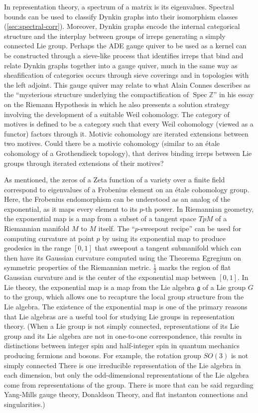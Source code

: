 \documentclass{article}
\theoremstyle{definition}
\begin{document}
In representation theory, a spectrum of a matrix is its eigenvalues.
Spectral bounds can be used to classify Dynkin graphs into their isomorphism classes (\cref{sec:spectral-corr}).
Moreover, Dynkin graphs encode the internal categorical structure and the interplay between groups of irreps generating a simply connected Lie group.
Perhaps the ADE gauge quiver to be used as a kernel can be constructed through a sieve-like process that identifies irreps that bind and relate Dynkin graphs together into a gauge quiver, much in the same way as sheafification of categories occurs through sieve coverings and in topologies with the left adjoint.
This gauge quiver may relate to what Alain Connes describes as the ``mysterious structure underlying the compactification of $ \operatorname{Spec} \mathbb{Z}$'' in his essay on the Riemann Hypothesis in which he also preesents a solution strategy involving the development of a suitable Weil cohomology.
The category of motives is defined to be a category such that every Weil cohomology (viewed as a functor) factors through it. Motivic cohomology are iterated extensions between two motives. Could there be a motivic cohomology (similar to an étale cohomology of a Grothendieck topology), that derives binding irreps between Lie groups through iterated extensions of their motives?
 
As mentioned, the zeros of a Zeta function of a variety over a finite field correspond to eigenvalues of a Frobenius element on an étale cohomology group.
Here, the Frobenius endomorphism can be understood as an analog of the exponential, as it maps every element to its $p$-th power.    
In Riemannian geometry, the exponential map is a map from a subset of a tangent space $TpM$ of a Riemannian manifold $M$ to $M$ itself.
The ``$p$-sweepout recipe'' can be used for computing curvature at point $p$ by using its exponential map to produce geodesics in the range $[0,1]$ that sweepout a tangent submanifold which can then have its Gaussian curvature computed using the Theorema Egregium on symmetric properties of the Riemannian metric.
$\frac{1}{2}$ marks the region of flat Gaussian curvature and is the center of the exponential map between $[0, 1]$.
In Lie theory, the exponential map is a map from the Lie algebra ${\mathfrak {g}}$ of a Lie group $G$ to the group, which allows one to recapture the local group structure from the Lie algebra. 
The existence of the exponential map is one of the primary reasons that Lie algebras are a useful tool for studying Lie groups in representation theory.
(When a Lie group is not simply connected, representations of its Lie group and its Lie algebra are not in one-to-one correspondence, this results in distinctions between integer spin and half-integer spin in quantum mechanics producing fermions and bosons.
For example, the rotation group $SO(3)$ is not simply connected There is one irreducible representation of the Lie algebra in each dimension, but only the odd-dimensional representations of the Lie algebra come from representations of the group. There is more that can be said regarding Yang-Mills gauge theory, Donaldson Theory, and flat instanton connections and singularities.)
\end{document}
